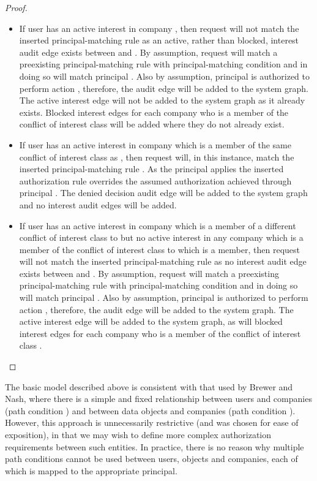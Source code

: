 \documentclass{article}
\begin{document}
\begin{proof}
\begin{itemize}
        \item If user  has an active interest in company , then request  will not match the inserted principal-matching rule  as an active, rather than blocked, interest audit edge exists between  and .
            By assumption, request  will match a preexisting principal-matching rule with principal-matching condition  and in doing so will match principal .
            Also by assumption, principal  is authorized to perform action , therefore, the audit edge  will be added to the system graph.
            The active interest edge  will not be added to the system graph as it already exists.
            Blocked interest edges  for each company  who is a member of the conflict of interest class  will be added where they do not already exist.

        \item If user  has an active interest in company  which is a member of the same conflict of interest class  as , then request  will, in this instance, match the inserted principal-matching rule .
            As the principal  applies the inserted authorization rule  overrides the assumed authorization achieved through principal .
            The denied decision audit edge  will be added to the system graph and no interest audit edges will be added.

        \item If user  has an active interest in company  which is a member of a different conflict of interest class  to  but no active interest in any company which is a member of the conflict of interest class  to which  is a member, then request  will not match the inserted principal-matching rule  as no interest audit edge exists between  and .
            By assumption, request  will match a preexisting principal-matching rule with principal-matching condition  and in doing so will match principal .
            Also by assumption, principal  is authorized to perform action , therefore, the audit edge  will be added to the system graph.
            The active interest edge  will be added to the system graph, as will blocked interest edges  for each company  who is a member of the conflict of interest class .
\end{itemize}
\end{proof}

The basic model described above is consistent with that used by Brewer and Nash, where there is a simple and fixed relationship between users and companies (path condition ) and between data objects and companies (path condition ).
However, this approach is unnecessarily restrictive (and was chosen for ease of exposition), in that we may wish to define more complex authorization requirements between such entities.
In practice, there is no reason why multiple path conditions cannot be used between users, objects and companies, each of which is mapped to the appropriate principal.
\end{document}
